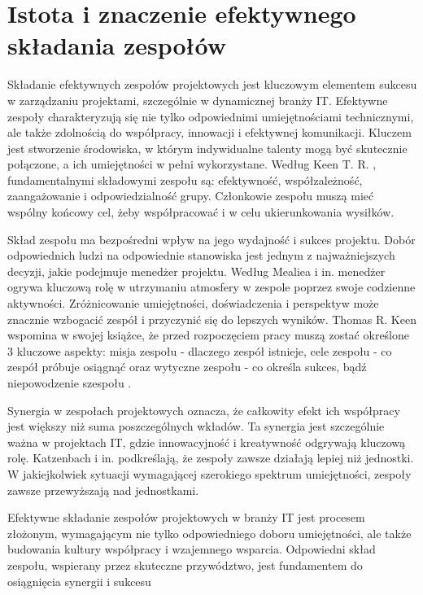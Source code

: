 \section{Istota i znaczenie efektywnego składania zespołów}
\par Składanie efektywnych zespołów projektowych jest kluczowym elementem sukcesu w zarządzaniu projektami, szczególnie w dynamicznej branży IT. Efektywne zespoły charakteryzują się nie tylko odpowiednimi umiejętnościami technicznymi, ale także zdolnością do współpracy, innowacji i efektywnej komunikacji. Kluczem jest stworzenie środowiska, w którym indywidualne talenty mogą być skutecznie połączone, a ich umiejętności w pełni wykorzystane. Według Keen T. R. \parencite{keen2003creating}, fundamentalnymi składowymi zespołu są: efektywność, współzależność, zaangażowanie i odpowiedzialność grupy. Członkowie zespołu muszą mieć wspólny końcowy cel, żeby współpracować i w celu ukierunkowania wysiłków.
\par Skład zespołu ma bezpośredni wpływ na jego wydajność i sukces projektu. Dobór odpowiednich ludzi na odpowiednie stanowiska jest jednym z najważniejszych decyzji, jakie podejmuje menedżer projektu. Według Mealiea i in. \parencite{mealiea2005strategic} menedżer ogrywa kluczową rolę w utrzymaniu atmosfery w zespole poprzez swoje codzienne aktywności. Zróżnicowanie umiejętności, doświadczenia i perspektyw może znacznie wzbogacić zespół i przyczynić się do lepszych wyników. Thomas R. Keen wspomina w swojej książce, że przed rozpoczęciem pracy muszą zostać określone 3 kluczowe aspekty: misja zespołu - dlaczego zespół istnieje, cele zespołu - co zespół próbuje osiągnąć oraz wytyczne zespołu - co określa sukces, bądź niepowodzenie szespołu \parencite{keen2003creating}.
\par Synergia w zespołach projektowych oznacza, że całkowity efekt ich współpracy jest większy niż suma poszczególnych wkładów. Ta synergia jest szczególnie ważna w projektach IT, gdzie innowacyjność i kreatywność odgrywają kluczową rolę. Katzenbach i in. \parencite{katzenbach2015wisdom} podkreślają, że zespoły zawsze działają lepiej niż jednostki. W jakiejkolwiek sytuacji wymagającej szerokiego spektrum umiejętności, zespoły zawsze przewyższają nad jednostkami.
\par Efektywne składanie zespołów projektowych w branży IT jest procesem złożonym, wymagającym nie tylko odpowiedniego doboru umiejętności, ale także budowania kultury współpracy i wzajemnego wsparcia. Odpowiedni skład zespołu, wspierany przez skuteczne przywództwo, jest fundamentem do osiągnięcia synergii i sukcesu

